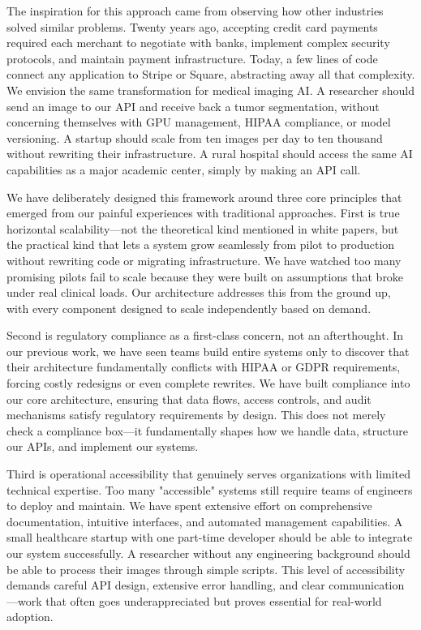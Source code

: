 \documentclass[12pt,a4paper]{article}
\begin{document}
The inspiration for this approach came from observing how other industries solved similar problems. Twenty years ago, accepting credit card payments required each merchant to negotiate with banks, implement complex security protocols, and maintain payment infrastructure. Today, a few lines of code connect any application to Stripe or Square, abstracting away all that complexity. We envision the same transformation for medical imaging AI. A researcher should send an image to our API and receive back a tumor segmentation, without concerning themselves with GPU management, HIPAA compliance, or model versioning. A startup should scale from ten images per day to ten thousand without rewriting their infrastructure. A rural hospital should access the same AI capabilities as a major academic center, simply by making an API call.

We have deliberately designed this framework around three core principles that emerged from our painful experiences with traditional approaches. First is true horizontal scalability—not the theoretical kind mentioned in white papers, but the practical kind that lets a system grow seamlessly from pilot to production without rewriting code or migrating infrastructure. We have watched too many promising pilots fail to scale because they were built on assumptions that broke under real clinical loads. Our architecture addresses this from the ground up, with every component designed to scale independently based on demand.

Second is regulatory compliance as a first-class concern, not an afterthought. In our previous work, we have seen teams build entire systems only to discover that their architecture fundamentally conflicts with HIPAA or GDPR requirements, forcing costly redesigns or even complete rewrites. We have built compliance into our core architecture, ensuring that data flows, access controls, and audit mechanisms satisfy regulatory requirements by design. This does not merely check a compliance box—it fundamentally shapes how we handle data, structure our APIs, and implement our systems.

Third is operational accessibility that genuinely serves organizations with limited technical expertise. Too many "accessible" systems still require teams of engineers to deploy and maintain. We have spent extensive effort on comprehensive documentation, intuitive interfaces, and automated management capabilities. A small healthcare startup with one part-time developer should be able to integrate our system successfully. A researcher without any engineering background should be able to process their images through simple scripts. This level of accessibility demands careful API design, extensive error handling, and clear communication—work that often goes underappreciated but proves essential for real-world adoption.
\end{document}
